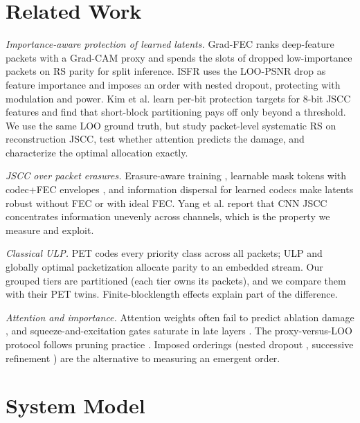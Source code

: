 \documentclass[conference]{IEEEtran}
\begin{document}
\section{Related Work}
\emph{Importance-aware protection of learned latents.} Grad-FEC \cite{uyanik2023gradfec} ranks deep-feature
packets with a Grad-CAM proxy and spends the slots of dropped low-importance packets on RS parity for
split inference. ISFR \cite{zhan2026isfr} uses the LOO-PSNR drop as feature importance and imposes an
order with nested dropout, protecting with modulation and power. Kim et al. \cite{kim2025uep} learn
per-bit protection targets for 8-bit JSCC features and find that short-block partitioning pays off only
beyond a threshold. We use the same LOO ground truth, but study packet-level systematic RS on
reconstruction JSCC, test whether attention predicts the damage, and characterize the optimal allocation
exactly.

\emph{JSCC over packet erasures.} Erasure-aware training \cite{esfahanizadeh2026block}, learnable mask tokens
with codec+FEC envelopes \cite{bo2026lgsemcom}, and information dispersal for learned codecs
\cite{wei2026everypacket} make latents robust without FEC or with ideal FEC. Yang et al.
\cite{yang2025partitioning} report that CNN JSCC concentrates information unevenly across channels, which
is the property we measure and exploit.

\emph{Classical ULP.} PET \cite{albanese1996pet} codes every priority class across all packets; ULP
\cite{mohr2000ulp} and globally optimal packetization \cite{dumitrescu2004optimal} allocate parity to an
embedded stream. Our grouped tiers are partitioned (each tier owns its packets), and we compare them with
their PET twins. Finite-blocklength effects \cite{polyanskiy2010finite} explain part of the difference.

\emph{Attention and importance.} Attention weights often fail to predict ablation damage
\cite{jain2019attention,morcos2018single}, and squeeze-and-excitation gates saturate in late layers
\cite{hu2018se}. The proxy-versus-LOO protocol follows pruning practice \cite{molchanov2017pruning}.
Imposed orderings (nested dropout \cite{rippel2014nested}, successive refinement \cite{kurka2021bandwidth})
are the alternative to measuring an emergent order.

\section{System Model}
\end{document}
